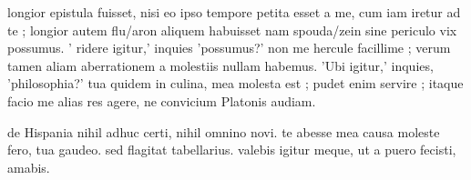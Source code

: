 


 longior epistula fuisset, nisi eo ipso tempore petita esset a me, cum iam iretur ad te ; longior autem flu/aron aliquem habuisset nam spouda/zein sine periculo vix possumus. ' ridere igitur,' inquies 'possumus?' non me hercule facillime ; verum tamen aliam aberrationem a molestiis nullam habemus. 'Ubi igitur,' inquies, 'philosophia?' tua quidem in culina, mea molesta est ; pudet enim servire ; itaque facio me alias res agere, ne convicium Platonis audiam.

 de Hispania nihil adhuc certi, nihil omnino novi. te abesse mea causa moleste fero, tua gaudeo. sed flagitat tabellarius. valebis igitur meque, ut a puero fecisti, amabis.
